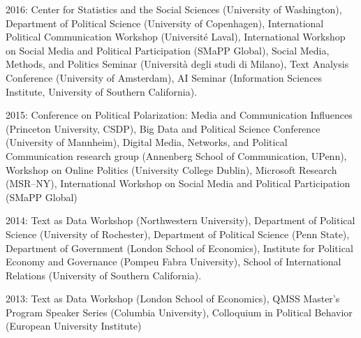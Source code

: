 \documentclass[margin,line,11pt]{resume}
\newcommand{\nl}{\vspace{0.10in}\\}
\begin{document}
\begin{resume}
2016: Center for Statistics and the Social Sciences (University of Washington), Department of Political Science (University of Copenhagen), International Political Communication Workshop (Universit\'{e} Laval), International Workshop on Social Media and Political Participation (SMaPP Global), Social Media, Methods, and Politics Seminar (Universit\`{a} degli studi di Milano), Text Analysis Conference (University of Amsterdam), AI Seminar (Information Sciences Institute, University of Southern California).

2015: Conference on Political Polarization: Media and Communication Influences (Princeton University, CSDP), Big Data and Political Science Conference (University of Mannheim), Digital Media, Networks, and Political Communication research group (Annenberg School of Communication, UPenn), Workshop on Online Politics (University College Dublin), Microsoft Research (MSR--NY), International Workshop on Social Media and Political Participation (SMaPP Global)

2014: Text as Data Workshop (Northwestern University), Department of Political Science (University of Rochester), Department of Political Science (Penn State), Department of Government (London School of Economics), Institute for Political Economy and Governance (Pompeu Fabra University), School of International Relations (University of Southern California).

2013: Text as Data Workshop (London School of Economics), QMSS Master's Program Speaker Series (Columbia University), Colloquium in Political Behavior (European University Institute)

   
    
    

\end{resume}
\end{document}
